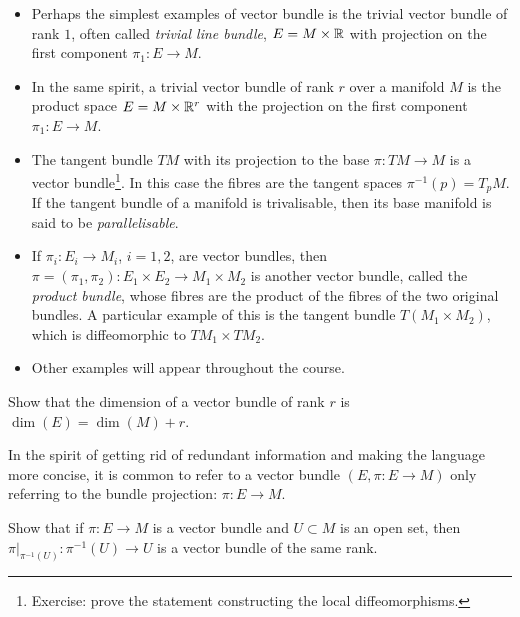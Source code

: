 \begin{example}\label{ex:simple_bundles}
  \begin{itemize}
    \item Perhaps the simplest examples of vector bundle is the trivial vector bundle of rank $1$, often called \emph{trivial line bundle}, $E = M \times \mathbb{R}$ with projection on the first component $\pi_1: E \to M$.
    \item In the same spirit, a trivial vector bundle of rank $r$ over a manifold $M$ is the product space $E = M\times \mathbb{R}^r$ with the projection on the first component $\pi_1: E\to M$.
    \item The tangent bundle $TM$ with its projection to the base $\pi:TM\to M$ is a vector bundle\footnote{Exercise: prove the statement constructing the local diffeomorphisms.}.
          In this case the fibres are the tangent spaces $\pi^{-1}(p) = T_pM$.
          If the tangent bundle of a manifold is trivalisable, then its base manifold is said to be \emph{parallelisable}.
    \item If $\pi_i: E_i\to M_i$, $i=1,2$, are vector bundles, then $\pi = (\pi_1, \pi_2): E_1\times E_2 \to M_1\times M_2$ is another vector bundle, called the \emph{product bundle}, whose fibres are the product of the fibres of the two original bundles.
          A particular example of this is the tangent bundle $T(M_1\times M_2)$, which is diffeomorphic to $TM_1 \times TM_2$.
    \item Other examples will appear throughout the course.
  \end{itemize}
\end{example}

\begin{exercise}
  Show that the dimension of a vector bundle of rank $r$ is $\dim(E) = \dim(M) + r$.
\end{exercise}

\begin{remark}
  In the spirit of getting rid of redundant information and making the language more concise, it is common to refer to a vector bundle $(E, \pi : E \to M)$ only referring to the bundle projection: $\pi : E \to M$.
\end{remark}

\begin{exercise}
  Show that if $\pi:E\to M$ is a vector bundle and $U\subset M$ is an open set, then $\pi\big|_{\pi^{-1}(U)}: \pi^{-1}(U) \to U$ is a vector bundle of the same rank.
\end{exercise}

